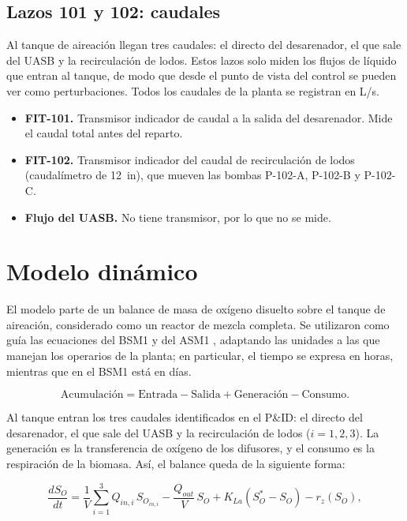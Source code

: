 \subsection*{Lazos 101 y 102: caudales}

Al tanque de aireación llegan tres caudales: el directo del desarenador, el que
sale del UASB y la recirculación de lodos. Estos lazos solo miden los flujos de
líquido que entran al tanque, de modo que desde el punto de vista del control se
pueden ver como perturbaciones. Todos los caudales de la planta se registran en L/s.

\begin{itemize}
  \item \textbf{FIT-101.} Transmisor indicador de caudal a la salida del
  desarenador. Mide el caudal total antes del reparto.
  \item \textbf{FIT-102.} Transmisor indicador del caudal de recirculación de
  lodos (caudalímetro de 12~in), que mueven las bombas P-102-A, P-102-B y P-102-C.
  \item \textbf{Flujo del UASB.} No tiene transmisor, por lo que no se mide.
\end{itemize}


\section{Modelo dinámico}
\label{sec:car_modelo}

El modelo parte de un balance de masa de oxígeno disuelto sobre el tanque de
aireación, considerado como un reactor de mezcla completa. Se utilizaron como
guía las ecuaciones del BSM1 \cite{alex2008bsm1} y del ASM1
\cite{henze1987asm1}, adaptando las unidades a las que manejan los operarios de
la planta; en particular, el tiempo se expresa en horas, mientras que en el
BSM1 está en días.

\begin{equation}
\text{Acumulación}=\text{Entrada}-\text{Salida}+\text{Generación}-\text{Consumo}.
\end{equation}

Al tanque entran los tres caudales identificados en el P\&ID: el directo del
desarenador, el que sale del UASB y la recirculación de lodos ($i=1,2,3$). La
generación es la transferencia de oxígeno de los difusores, y el consumo es la
respiración de la biomasa. Así, el balance queda de la siguiente forma:

\begin{equation}
\frac{dS_O}{dt}=\frac{1}{V}\sum_{i=1}^3 Q_{in,i}\,S_{O_{in,i}}
-\frac{Q_{out}}{V}\,S_O+K_{La}\left(S^{*}_O-S_O\right)-r_z(S_O),
\label{eq:car_balance}
\end{equation}

